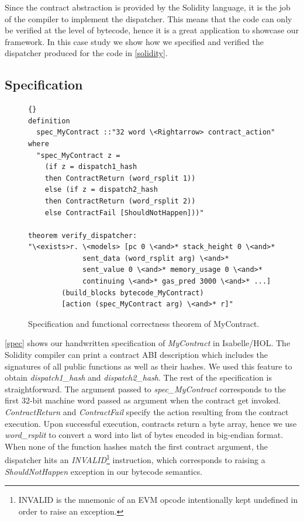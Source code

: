 \documentclass[sigplan,10pt,review]{acmart}\settopmatter{printfolios=true,printccs=false,printacmref=false}
\begin{document}
Since the contract abstraction is provided by the Solidity language,
it is the job of the compiler to implement the dispatcher.
This means that the code can only be verified at the level of bytecode,
hence it is a great application to showcase our framework.
In this case study we show how we specified and verified the
dispatcher produced for the code in \autoref{solidity}.
%

\subsection{Specification}

\begin{figure}[h]
\begin{lstlisting}[language=Isar]{}
definition 
  spec_MyContract ::"32 word \<Rightarrow> contract_action"
where
  "spec_MyContract z = 
	(if z = dispatch1_hash 
	then ContractReturn (word_rsplit 1))
	else (if z = dispatch2_hash 
	then ContractReturn (word_rsplit 2))
	else ContractFail [ShouldNotHappen]))"

theorem verify_dispatcher:
"\<exists>r. \<models> [pc 0 \<and>* stack_height 0 \<and>*
             sent_data (word_rsplit arg) \<and>*
             sent_value 0 \<and>* memory_usage 0 \<and>*
             continuing \<and>* gas_pred 3000 \<and>* ...]
        (build_blocks bytecode_MyContract)
        [action (spec_MyContract arg) \<and>* r]"
\end{lstlisting}
\caption{Specification and functional correctness theorem of MyContract.}
\label{spec}
\end{figure}

\autoref{spec} shows our handwritten specification of \textit{MyContract} in Isabelle/HOL.
The Solidity compiler can print a contract ABI description which includes the
signatures of all public functions as well as their hashes.
We used this feature to obtain \textit{dispatch1\_hash} and \textit{dispatch2\_hash}.
The rest of the specification is straightforward.
The argument passed to \textit{spec\_MyContract} corresponds to the first 32-bit
machine word passed as argument when the contract get invoked.
\textit{ContractReturn} and \textit{ContractFail} specify the action
resulting from the contract execution.
Upon successful execution, contracts return a byte array,
hence we use \textit{word\_rsplit} to convert a word into list of bytes
encoded in big-endian format.
When none of the function hashes match the first contract argument,
the dispatcher hits an \textit{INVALID}\footnote{INVALID is the mnemonic
of an EVM opcode intentionally kept undefined in order to raise an exception.} instruction,
which corresponds to raising a \textit{ShouldNotHappen} exception
in our bytecode semantics.
\end{document}
